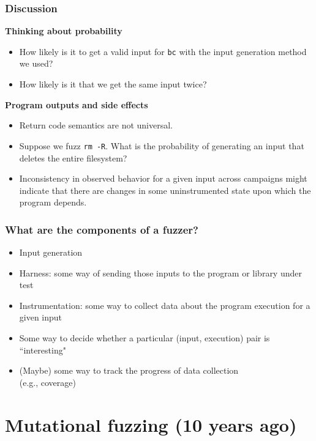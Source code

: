 \documentclass{beamer}
\begin{document}
\begin{frame}
	\frametitle{Discussion}
	\textbf{Thinking about probability} \begin{itemize}
		\item{How likely is it to get a valid input for \texttt{bc} with the input generation method we used?} \pause
		\item{How likely is it that we get the same input twice?} \pause
	\end{itemize}

	\vspace{\baselineskip}

	\textbf{Program outputs and side effects} \begin{itemize}
		\item{Return code semantics are not universal.} \pause
		\item{Suppose we fuzz \texttt{rm -R}. What is the probability of generating an input that deletes the entire filesystem?} \pause
		\item{Inconsistency in observed behavior for a given input across campaigns might indicate that there are changes in some uninstrumented state upon which the program depends.} %
	\end{itemize}
	
\end{frame}

\begin{frame}
\end{frame}

\begin{frame}
	\frametitle{What are the components of a fuzzer?}
	\begin{itemize}
		\item{Input generation}
		\item{Harness: some way of sending those inputs to the program or library under test}
		\item{Instrumentation: some way to collect data about the program execution for a given input}
		\item{Some way to decide whether a particular (input, execution) pair is ``interesting"}
		\item{(Maybe) some way to track the progress of data collection \\ (e.g., coverage)}
	\end{itemize}
\end{frame}

\section[Mutational fuzzing]{Mutational fuzzing \normalsize{(10 years ago)}}
\end{document}
